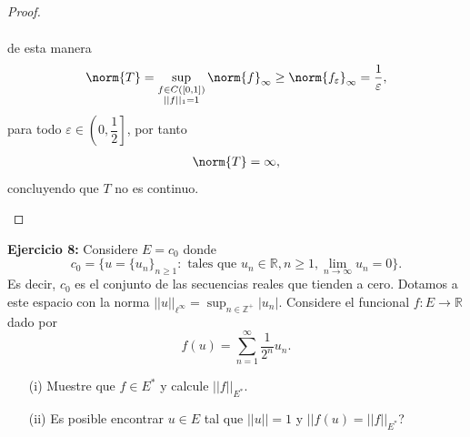\begin{proof}
\begin{enumerate}
\begin{align*}
    \end{align*}
    de esta manera
    \begin{align*}
        \norm{T}=\sup_{\substack{f\in C([0,1])\\||f||_1= 1}}\norm{f}_\infty\geq \norm{f_\varepsilon}_\infty=\frac{1}{\varepsilon},
    \end{align*}
    para todo $\varepsilon\in \left(0,\dfrac{1}{2}\right]$, por tanto
    \begin{align*}
        \norm{T}=\infty,
    \end{align*}
    concluyendo que $T$ no es continuo.
    \end{enumerate}
\end{proof}





\textbf{Ejercicio 8:} Considere $E=c_0$ donde
$$c_0 =\{ u = \{u_n\}_{n\geq 1}: \text{ tales que } u_n\in \mathbb{R}, n\geq 1, \displaystyle\lim_{n\to\infty}u_n=0\}.$$
Es decir, $c_0$ es el conjunto de las secuencias reales que tienden a cero. Dotamos a este espacio con la norma $||u||_{\ell^{\infty}}=\displaystyle\sup_{n\in\mathbb{Z}^+}|u_n|$. Considere el funcional $f:E\to \mathbb{R}$ dado por 
$$f(u) = \displaystyle\sum_{n=1}^{\infty}\frac{1}{2^n}u_n.$$
\begin{itemize}
    \item[(i)] Muestre que $f\in E^*$ y calcule $||f||_{E^*}$.
    \item[(ii)] Es posible encontrar $u\in E$ tal que $||u||=1$ y $||f(u)=||f||_{E^*}$?
\end{itemize}

